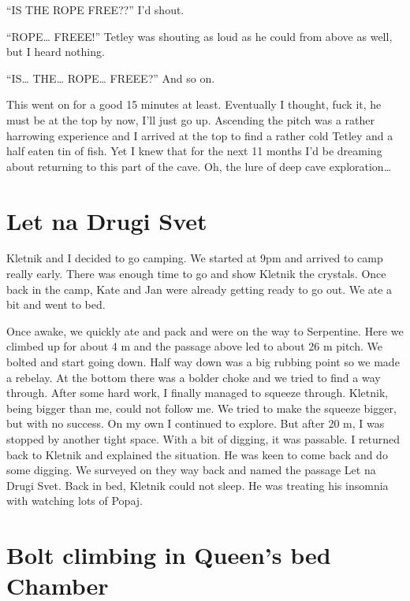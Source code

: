 ``IS THE ROPE FREE??'' I'd shout.

``ROPE\ldots{} FREEE!'' Tetley was shouting as loud as he could from
above as well, but I heard nothing.

``IS\ldots{} THE\ldots{} ROPE\ldots{} FREEE?'' And so on.

This went on for a good 15 minutes at least. Eventually I thought, fuck
it, he must be at the top by now, I'll just go up. Ascending the pitch
was a rather harrowing experience and I arrived at the top to find a
rather cold Tetley and a half eaten tin of fish. Yet I knew that for the
next 11 months I'd be dreaming about returning to this part of the cave.
Oh, the lure of deep cave exploration\ldots{}


\section{Let na Drugi Svet}\label{let-na-drugi-svet}

Kletnik and I decided to go camping. We started at 9pm and arrived to
camp really early. There was enough time to go and show Kletnik the
crystals. Once back in the camp, Kate and Jan were already getting ready
to go out. We ate a bit and went to bed.

Once awake, we quickly ate and pack and were on the way to Serpentine.
Here we climbed up for about 4 m and the passage above led to about 26 m
pitch. We bolted and start going down. Half way down was a big rubbing
point so we made a rebelay. At the bottom there was a bolder choke and
we tried to find a way through. After some hard work, I finally managed
to squeeze through. Kletnik, being bigger than me, could not follow me.
We tried to make the squeeze bigger, but with no success. On my own I
continued to explore. But after 20 m, I was stopped by another tight
space. With a bit of digging, it was passable. I returned back to
Kletnik and explained the situation. He was keen to come back and do
some digging. We surveyed on they way back and named the passage Let na
Drugi Svet. Back in bed, Kletnik could not sleep. He was treating his
insomnia with watching lots of Popaj.


\section{Bolt climbing in Queen's bed
Chamber}\label{bolt-climbing-in-queens-bed-chamber}

